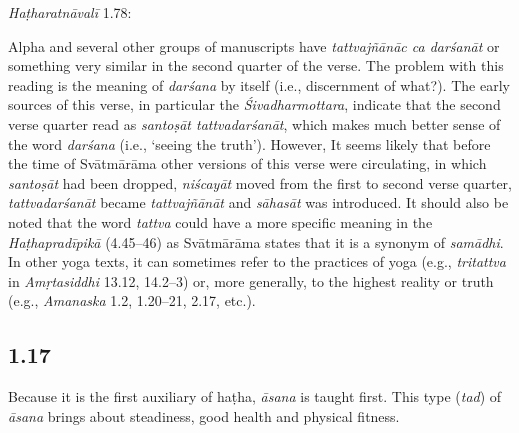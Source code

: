 \begin{ekdosis}
\begin{testimonia}[hp01_016]
\begin{versinnote}
\end{versinnote}

\emph{Haṭharatnāvalī} 1.78:

\begin{versinnote}
\tl{\var{niścayād ] niścalād- P,T}\\!}
\end{versinnote}

\end{testimonia}

\begin{philcomm}[hp01_016]    
Alpha and several other groups of manuscripts have \emph{tattvajñānāc ca darśanāt} or something very similar in the second quarter of the verse. The problem with this reading is the meaning of \emph{darśana} by itself (i.e., discernment of what?). The early sources of this verse, in particular the \emph{Śivadharmottara}, indicate that the second verse quarter read as \emph{santoṣāt tattvadarśanāt}, which makes much better sense of the word \emph{darśana} (i.e., ‘seeing the truth’). However, It seems likely that before the time of Svātmārāma other versions of this verse were circulating, in which \emph{santoṣāt} had been dropped, \emph{niścayāt} moved from the first to second verse quarter, \emph{tattvadarśanāt} became \emph{tattvajñānāt} and \emph{sāhasāt} was introduced. It should also be noted that the word \emph{tattva} could have a more specific meaning in the \emph{Haṭhapradīpikā} (4.45–46) as Svātmārāma states that it is a synonym of \emph{samādhi}. In other yoga texts, it can sometimes refer to the practices of yoga (e.g., \emph{tritattva} in \emph{Amṛtasiddhi} 13.12, 14.2--3) or, more generally, to the highest reality or truth (e.g., \emph{Amanaska} 1.2, 1.20–21, 2.17, etc.).  
\end{philcomm}

\subsection*{1.17}
\begin{translation}[hp01_017]
Because it is the first auxiliary of haṭha, \emph{āsana} is taught first. This type (\emph{tad}) of \emph{āsana} brings about steadiness, good health and physical fitness.
\end{translation}


\end{ekdosis}
